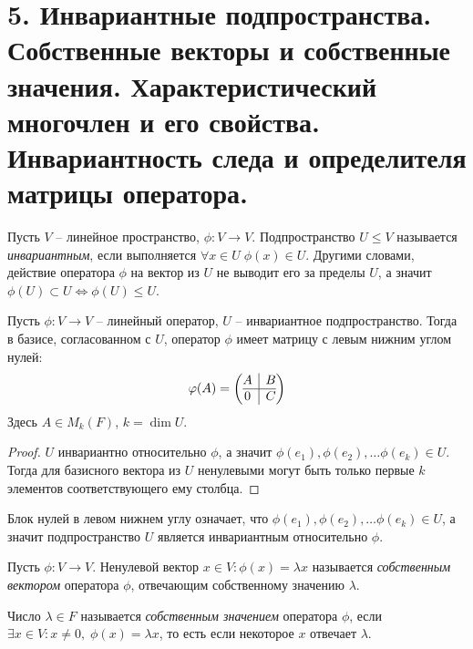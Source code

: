 \section{5. Инвариантные подпространства. Собственные векторы и собственные значения. Характеристический многочлен и его свойства. Инвариантность следа и определителя матрицы оператора.}

\begin{definition}
    Пусть $V$ -- линейное пространство, $\phi: V \to V$. Подпространство $U \leq V$ называется 
    \textit{инвариантным}, если выполняется $\forall x \in U \; \phi(x) \in U$. Другими словами, действие 
    оператора $\phi$ на вектор из $U$ не выводит его за пределы $U$, а значит 
    $\phi(U) \subset U \Leftrightarrow \phi(U) \leq U$.
\end{definition}

\begin{proposition}
    Пусть $\phi: V \to V$ -- линейный оператор, $U$ -- инвариантное подпространство. Тогда в базисе, 
    согласованном с $U$, оператор $\phi$ имеет матрицу с левым нижним углом нулей:
    \[\phi(A) = \left(\begin{array}{@{}c|c@{}}
		A & B\\
		\hline
		0 & C
	\end{array}\right)\]
    Здесь $A \in M_k(F)$, $k = \dim U$.
\end{proposition}

\begin{proof}
    $U$ инвариантно относительно $\phi$, а значит $\phi(e_1), \phi(e_2), \dots \phi(e_k) \in U$.
    Тогда для базисного вектора из $U$ ненулевыми могут быть только первые $k$ элементов 
    соответствующего ему столбца.
\end{proof}

\begin{note}
    Блок нулей в левом нижнем углу означает, что $\phi(e_1), \phi(e_2), \dots \phi(e_k) \in U$, 
    а значит подпространство $U$ является инвариантным относительно $\phi$.
\end{note}

\begin{definition}
    Пусть $\phi: V \to V$. Ненулевой вектор
    $x \in V: \phi(x) = \lambda x$ называется \textit{собственным вектором} оператора $\phi$, 
    отвечающим собственному значению $\lambda$.
\end{definition}

\begin{definition}
    Число $\lambda \in F$ называется \textit{собственным значением} оператора $\phi$, если 
    $\exists x \in V: x \neq 0,\; \phi(x) = \lambda x$,
    то есть если некоторое $x$ отвечает $\lambda$.
\end{definition}

